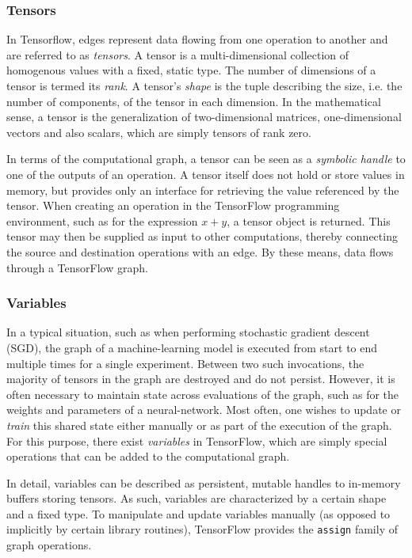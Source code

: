 \subsubsection{Tensors}\label{sec:model-graphs-tensors}

In Tensorflow, edges represent data flowing from one operation to another and
are referred to as \emph{tensors}. A tensor is a multi-dimensional collection of
homogenous values with a fixed, static type. The number of dimensions of a
tensor is termed its \emph{rank}. A tensor's \emph{shape} is the tuple
describing the size, i.e. the number of components, of the tensor in each
dimension. In the mathematical sense, a tensor is the generalization of
two-dimensional matrices, one-dimensional vectors and also scalars, which are
simply tensors of rank zero.

In terms of the computational graph, a tensor can be seen as a \emph{symbolic
  handle} to one of the outputs of an operation. A tensor itself does not hold
or store values in memory, but provides only an interface for retrieving the
value referenced by the tensor. When creating an operation in the TensorFlow
programming environment, such as for the expression $x + y$, a tensor object is
returned. This tensor may then be supplied as input to other computations,
thereby connecting the source and destination operations with an edge. By these
means, data flows through a TensorFlow graph.

\subsubsection{Variables}\label{sec:model-graphs-vars}

In a typical situation, such as when performing stochastic gradient descent
(SGD), the graph of a machine-learning model is executed from start to end
multiple times for a single experiment. Between two such invocations, the
majority of tensors in the graph are destroyed and do not persist. However, it
is often necessary to maintain state across evaluations of the graph, such as
for the weights and parameters of a neural-network. Most often, one wishes to
update or \emph{train} this shared state either manually or as part of the
execution of the graph. For this purpose, there exist \emph{variables} in
TensorFlow, which are simply special operations that can be added to the
computational graph.

In detail, variables can be described as persistent, mutable handles to
in-memory buffers storing tensors. As such, variables are characterized by a
certain shape and a fixed type. To manipulate and update variables manually (as
opposed to implicitly by certain library routines), TensorFlow provides the
\texttt{assign} family of graph operations.

